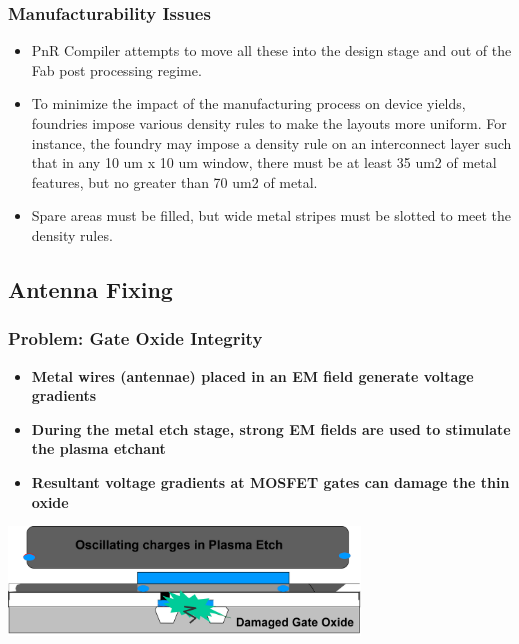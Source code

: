 \documentclass[compress]{beamer}
\begin{document}
\begin{frame}
	\frametitle{Manufacturability Issues}
	\begin{itemize}
		\item PnR Compiler attempts to move all these into the design stage and out of the Fab post processing regime.
		
		\item To minimize the impact of the manufacturing process on device yields, foundries impose various
		density rules to make the layouts more uniform. For instance, the foundry may impose a density
		rule on an interconnect layer such that in any 10 um x 10 um window, there must be at least 35
		um2 of metal features, but no greater than 70 um2 of metal.
		\item Spare areas must be filled, but wide metal stripes must be slotted to meet the density rules.
	\end{itemize}
\end{frame}

\subsection[Antenna]{Antenna Fixing}
\begin{frame}
	\frametitle{Problem: Gate Oxide Integrity}
	\begin{itemize}
		\item \textbf{Metal wires (antennae) placed in an EM field
		generate voltage gradients}
		\item \textbf{During the metal etch stage, strong EM fields are
		used to stimulate the plasma etchant}
		\item \textbf{Resultant voltage gradients at MOSFET gates can
		damage the thin oxide}
	\end{itemize}
	\begin{center}
		\includegraphics[width=0.7\textwidth]{Antenna}
	\end{center}
\end{frame}
\end{document}

